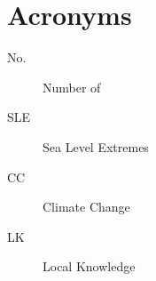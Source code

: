 
\chapter{Acronyms}
\begin{description}
\item[No.] Number of
\item[SLE] Sea Level Extremes
\item[CC] Climate Change
\item[LK] Local Knowledge
\end{description}
